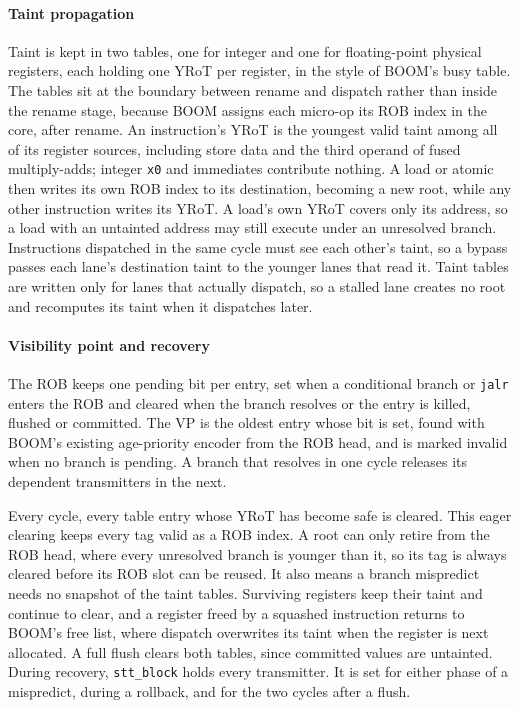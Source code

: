 
\paragraph{Taint propagation}
Taint is kept in two tables, one for integer and one for floating-point
physical registers, each holding one YRoT per register, in the style of BOOM's
busy table. The tables sit at the boundary between rename and dispatch rather
than inside the rename stage, because BOOM assigns each micro-op its ROB index
in the core, after rename. An instruction's YRoT is the youngest valid taint
among all of its register sources, including store data and the third operand
of fused multiply-adds; integer \texttt{x0} and immediates contribute nothing.
A load or atomic then writes its own ROB index to its destination, becoming a
new root, while any other instruction writes its YRoT. A load's own YRoT
covers only its address, so a load with an untainted address may still execute
under an unresolved branch. Instructions dispatched in the same cycle must see
each other's taint, so a bypass passes each lane's destination taint to the
younger lanes that read it. Taint tables are written only for lanes that
actually dispatch, so a stalled lane creates no root and recomputes its taint
when it dispatches later.

\paragraph{Visibility point and recovery}
The ROB keeps one pending bit per entry, set when a conditional branch or
\texttt{jalr} enters the ROB and cleared when the branch resolves or the entry
is killed, flushed or committed. The VP is the oldest entry whose bit is set,
found with BOOM's existing age-priority encoder from the ROB head, and is
marked invalid when no branch is pending. A branch that resolves in one cycle
releases its dependent transmitters in the next.

Every cycle, every table entry whose YRoT has become safe is cleared. This eager 
clearing keeps every tag valid as a ROB index. A root can only retire from the 
ROB head, where every unresolved branch is younger than it, so its tag is always 
cleared before its ROB slot can be reused. 
It also means a branch mispredict needs no snapshot of the taint tables. 
Surviving registers keep their taint and continue to clear, and a register freed 
by a squashed instruction returns to BOOM's free list, where dispatch overwrites 
its taint when the register is next allocated. A full flush clears both tables, since
committed values are untainted. During recovery, \texttt{stt\_block} holds
every transmitter. It is set for either phase of a mispredict, during a
rollback, and for the two cycles after a flush.

